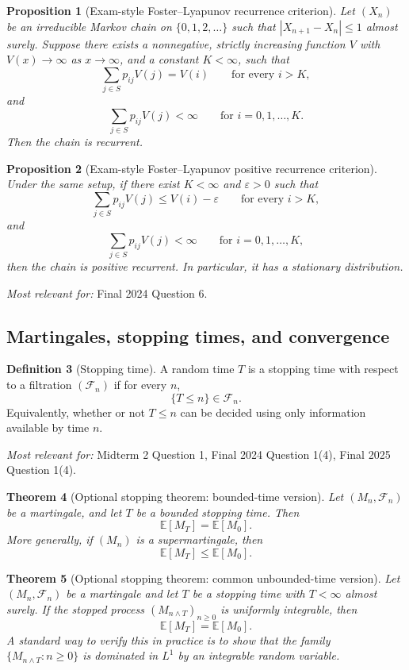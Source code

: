 \documentclass[11pt]{article}
\newtheorem{theorem}{Theorem}[section]
\newtheorem{proposition}[theorem]{Proposition}
\theoremstyle{definition}
\newtheorem{definition}[theorem]{Definition}
\begin{document}
\begin{proposition}[Exam-style Foster--Lyapunov recurrence criterion]
Let $(X_n)$ be an irreducible Markov chain on $\{0,1,2,\dots\}$ such that $|X_{n+1}-X_n|\le 1$ almost surely. Suppose there exists a nonnegative, strictly increasing function $V$ with $V(x)\to\infty$ as $x\to\infty$, and a constant $K<\infty$, such that
\[
\sum_{j\in S} p_{ij}V(j)=V(i)
\qquad \text{for every } i>K,
\]
and
\[
\sum_{j\in S} p_{ij}V(j)<\infty
\qquad \text{for } i=0,1,\dots,K.
\]
Then the chain is recurrent.
\end{proposition}

\begin{proposition}[Exam-style Foster--Lyapunov positive recurrence criterion]
Under the same setup, if there exist $K<\infty$ and $\varepsilon>0$ such that
\[
\sum_{j\in S} p_{ij}V(j) \le V(i)-\varepsilon
\qquad \text{for every } i>K,
\]
and
\[
\sum_{j\in S} p_{ij}V(j)<\infty
\qquad \text{for } i=0,1,\dots,K,
\]
then the chain is positive recurrent. In particular, it has a stationary distribution.
\end{proposition}

\emph{Most relevant for:} Final 2024 Question 6.

\subsection{Martingales, stopping times, and convergence}

\begin{definition}[Stopping time]
A random time $T$ is a stopping time with respect to a filtration $(\mathcal F_n)$ if for every $n$,
\[
\{T\le n\}\in \mathcal F_n.
\]
Equivalently, whether or not $T\le n$ can be decided using only information available by time $n$.
\end{definition}

\emph{Most relevant for:} Midterm 2 Question 1, Final 2024 Question 1(4), Final 2025 Question 1(4).

\begin{theorem}[Optional stopping theorem: bounded-time version]
Let $(M_n,\mathcal F_n)$ be a martingale, and let $T$ be a bounded stopping time. Then
\[
\mathbb E[M_T] = \mathbb E[M_0].
\]
More generally, if $(M_n)$ is a supermartingale, then
\[
\mathbb E[M_T] \le \mathbb E[M_0].
\]
\end{theorem}

\begin{theorem}[Optional stopping theorem: common unbounded-time version]
Let $(M_n,\mathcal F_n)$ be a martingale and let $T$ be a stopping time with $T<\infty$ almost surely. If the stopped process $(M_{n\wedge T})_{n\ge 0}$ is uniformly integrable, then
\[
\mathbb E[M_T] = \mathbb E[M_0].
\]
A standard way to verify this in practice is to show that the family $\{M_{n\wedge T}:n\ge 0\}$ is dominated in $L^1$ by an integrable random variable.
\end{theorem}
\end{document}
